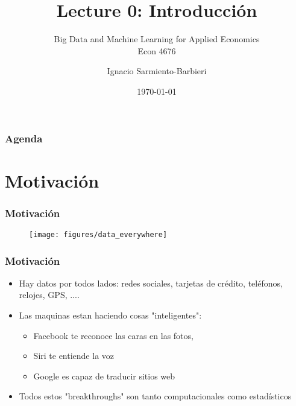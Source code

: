 \documentclass[
  shownotes,
  xcolor={svgnames},
  hyperref={colorlinks,citecolor=DarkBlue,linkcolor=DarkRed,urlcolor=DarkBlue}
  ]{beamer}
\begin{document}
\title{Lecture 0: Introducción}
\subtitle{Big Data and Machine Learning for Applied Economics \\ Econ 4676}
\date{\today}

\author[Sarmiento-Barbieri]{Ignacio Sarmiento-Barbieri}


\begin{frame}[noframenumbering]
\maketitle
\end{frame}





\begin{frame}
\frametitle{Agenda}

\tableofcontents


\end{frame}




\section{Motivación}
\begin{frame}
\frametitle{Motivación}

\begin{figure}[H] \centering
  \captionsetup{justification=centering}  
    \texttt{[image: figures/data\_everywhere]}
\end{figure}



\end{frame}

\begin{frame}
\frametitle{Motivación}

\begin{itemize}
      \item  Hay datos por todos lados: redes sociales, tarjetas de crédito, teléfonos, relojes, GPS, ....
      \bigskip
      \item  Las maquinas estan haciendo cosas "inteligentes":
      \begin{itemize}
        \item Facebook te reconoce las caras en las fotos,
        \item Siri te entiende la voz
        \item Google es capaz de traducir sitios web
      \end{itemize}
  \bigskip
  \item Todos estos "breakthroughs" son tanto computacionales como estadísticos
  \bigskip
\end{itemize}

\end{frame}
\end{document}
